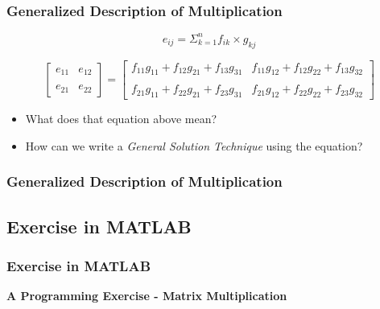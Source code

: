 \documentclass[fleqn]{beamer} %
\newcommand{\sectionIIsubsectionIIItitle}{Generalized Description of Multiplication}
\newcommand{\sectionIIsubsectionIVtitle}{Exercise in MATLAB}
\begin{document}
			\begin{frame}
				\frametitle{\sectionIIsubsectionIIItitle} \small
				\bigskip


				\begin{fleqn}		 
				\[ e_{ij}=\Sigma_{k=1}^n f_{ik}\times g_{kj} \]
	 
					\[
					\left[ \begin{array}{cc}
					e_{11} & e_{12}  \\
					& \\ 
					e_{21} & e_{22}  \end{array}	\right]=\left[ \begin{array}{c|c}
					f_{11}g_{11}+f_{12}g_{21}+f_{13}g_{31} & f_{11}g_{12}+f_{12}g_{22}+f_{13}g_{32}  \\
					& \\ 
					f_{21}g_{11}+f_{22}g_{21}+f_{23}g_{31} & f_{21}g_{12}+f_{22}g_{22}+f_{23}g_{32}  \end{array}	\right]
					\]
		 
				\end{fleqn}	

				\begin{itemize}
		
					\item What does that equation above mean? \\
					\item How can we write a {\it General Solution Technique} using the equation?
			
				\end{itemize}

				
				\btVFill 
			\end{frame}

			\begin{frame}
				\frametitle{\sectionIIsubsectionIIItitle}\small
				\bigskip



				\btVFill 
			\end{frame}


		\subsection{\sectionIIsubsectionIVtitle}\label{sectionIIsubsectionIV}

			\begin{frame}
				\frametitle{\sectionIIsubsectionIVtitle}
				\bigskip

				\textbf{A Programming Exercise - Matrix Multiplication}\\	


				\btVFill 
			\end{frame}
\end{document}
